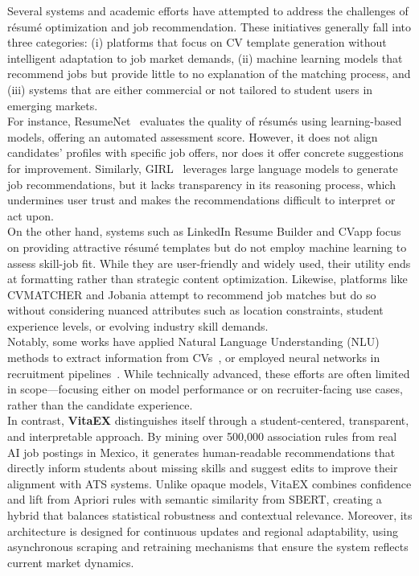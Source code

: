 \documentclass[runningheads]{llncs}
\begin{document}
	Several systems and academic efforts have attempted to address the challenges of résumé optimization and job recommendation. These initiatives generally fall into three categories: (i) platforms that focus on CV template generation without intelligent adaptation to job market demands, (ii) machine learning models that recommend jobs but provide little to no explanation of the matching process, and (iii) systems that are either commercial or not tailored to student users in emerging markets.\\
	
	For instance, ResumeNet~\cite{estadoarte3} evaluates the quality of résumés using learning-based models, offering an automated assessment score. However, it does not align candidates’ profiles with specific job offers, nor does it offer concrete suggestions for improvement. Similarly, GIRL~\cite{estadoarte2} leverages large language models to generate job recommendations, but it lacks transparency in its reasoning process, which undermines user trust and makes the recommendations difficult to interpret or act upon.\\
	
	On the other hand, systems such as LinkedIn Resume Builder and CVapp focus on providing attractive résumé templates but do not employ machine learning to assess skill-job fit. While they are user-friendly and widely used, their utility ends at formatting rather than strategic content optimization. Likewise, platforms like CVMATCHER and Jobania attempt to recommend job matches but do so without considering nuanced attributes such as location constraints, student experience levels, or evolving industry skill demands.\\
	
	Notably, some works have applied Natural Language Understanding (NLU) methods to extract information from CVs~\cite{estadoarte1}, or employed neural networks in recruitment pipelines~\cite{estadoarte4}. While technically advanced, these efforts are often limited in scope—focusing either on model performance or on recruiter-facing use cases, rather than the candidate experience.\\
	
	In contrast, \textbf{VitaEX} distinguishes itself through a student-centered, transparent, and interpretable approach. By mining over 500,000 association rules from real AI job postings in Mexico, it generates human-readable recommendations that directly inform students about missing skills and suggest edits to improve their alignment with ATS systems. Unlike opaque models, VitaEX combines confidence and lift from Apriori rules with semantic similarity from SBERT, creating a hybrid that balances statistical robustness and contextual relevance. Moreover, its architecture is designed for continuous updates and regional adaptability, using asynchronous scraping and retraining mechanisms that ensure the system reflects current market dynamics.\\
	
\end{document}
